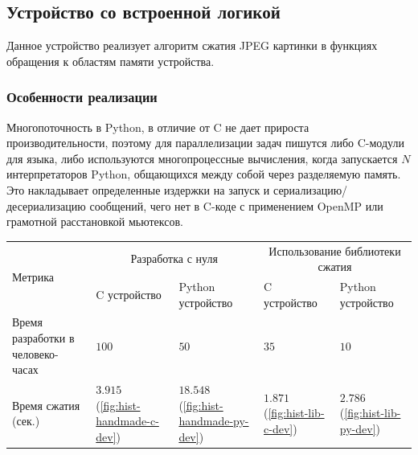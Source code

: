 %    

\subsection{Устройство со встроенной логикой}\label{sec:ch3/sec2/sec1}

Данное устройство реализует алгоритм сжатия JPEG картинки в функциях обращения
к областям памяти устройства.

\subsubsection{Особенности реализации}\label{sec:ch3/sec2/sec1/sec1}

Многопоточность в Python, в отличие от C не дает прироста производительности,
поэтому для параллелизации задач пишутся либо C-модули для языка, либо используются
многопроцессные вычисления, когда запускается $N$ интерпретаторов Python, общающихся
между собой через разделяемую память. Это накладывает определенные издержки на запуск
и сериализацию/десериализацию сообщений, чего нет в C-коде с применением OpenMP или
грамотной расстановкой мьютексов.

\begin{longtable}{| p{3cm} | p{3cm} | p{3cm} | p{3cm} | p{3cm} |}
    \hline
        \multirow{2}{*}{Метрика} &
        \multicolumn{2}{c|}{Разработка с нуля} &
        \multicolumn{2}{c|}{Использование библиотеки сжатия} \\
    \cline{2-5} &
        C устройство &
        Python устройство &
        C устройство &
        Python устройство \\
    \hline
        Время разработки в человеко-часах &
        $100$ &
        $50$ &
        $35$ &
        $10$ \\
    \hline
        Время сжатия (сек.)&
        $3.915$  (\cref{fig:hist-handmade-c-dev}) &
        $18.548$ (\cref{fig:hist-handmade-py-dev}) &
        $1.871$  (\cref{fig:hist-lib-c-dev}) &
        $2.786$  (\cref{fig:hist-lib-py-dev}) \\
    \hline
\end{longtable}

